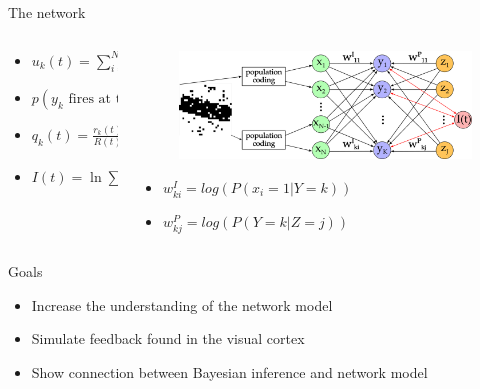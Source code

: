 \documentclass[aspectratio=169]{beamer}
\begin{document}
\begin{frame}{The network}
\vspace{-1.5cm}
  \begin{columns}[onlytextwidth]
	\begin{column}{0.5\textwidth}
	  \begin{itemize}
	    \item \small $u_k(t) = \sum_{i=1}^N w^{I}_{ki} \cdot x_i(t) + \sum_{j=1}^J w^{P}_{kj} \cdot z_j(t)$
	    \item \small $p(y_k \text{ fires at time t}) \propto e^{u_k(t) - I(t)}$
	    \item \small $q_k(t) = \frac{r_k(t) \delta t}{R(t) \delta t} = \frac{e^{u_k(t) - I(t)}}{\sum_{k'=1}^K e^{u_{k'}(t) - I(t)}} = \frac{e^{u_k(t)}}{\sum_{k'=1}^K e^{u_{k'}(t)}}$
		\item $I(t) =  \ln{  \sum_{k=1}^K e^{u_k(t)}} - \ln{R(t)}$
	  \end{itemize}
    \end{column}
    \begin{column}{0.5\textwidth}
        \begin{figure}
        \includegraphics[width=1\linewidth]{../Latex/figures/networkPlan.png}
      \end{figure}
      \begin{itemize}
        \item \small $w^{I}_{ki} = log(P(x_i = 1 | Y = k))$
	    \item \small $w^{P}_{kj} = log(P(Y = k | Z = j))$
      \end{itemize}       
	\end{column}
  \end{columns}
\end{frame}

\begin{frame}{Goals}


  \begin{itemize}

    \item Increase the understanding of the network model
    \item Simulate feedback found in the visual cortex
    \item Show connection between Bayesian inference and network model
  \end{itemize}
\end{frame}
\end{document}
